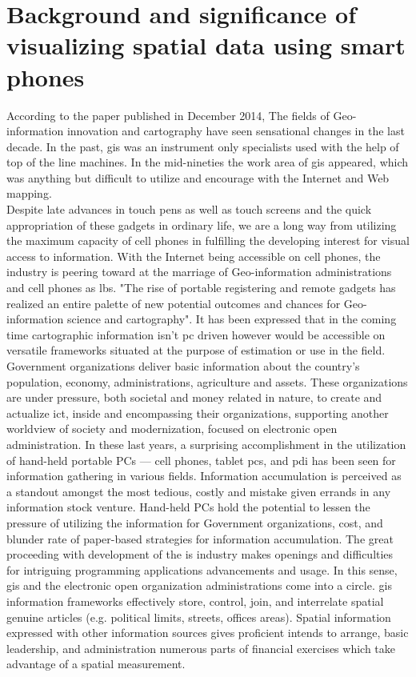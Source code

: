\section{Background and significance of visualizing spatial data using smart phones}

According to the paper published in December 2014\cite{GSR_3}, The fields of Geo-information innovation and cartography have seen sensational changes in the last decade. In the past, \gls{gis} was an instrument only specialists used with the help of top of the line machines. In the mid-nineties the work area of \gls{gis} appeared, which was anything but difficult to utilize and encourage with the Internet and Web mapping. \\
Despite late advances in touch pens as well as touch screens and the quick appropriation of these gadgets in ordinary life, we are a long way from utilizing the maximum capacity of cell phones in fulfilling the developing interest for visual access to information. With the Internet being accessible on cell phones, the industry is peering toward at the marriage of Geo-information administrations and cell phones as \gls{lbs}. "The rise of portable registering and remote gadgets has realized an entire palette of new potential outcomes and chances for Geo-information science and cartography". It has been expressed that in the coming time cartographic information isn't \gls{pc} driven however would be accessible on versatile frameworks situated at the purpose of estimation or use in the field. \\
Government organizations deliver basic information about the country's population, economy, administrations, agriculture and assets. These organizations are under pressure, both societal and money related in nature, to create and actualize \gls{ict}, inside and encompassing their organizations, supporting another worldview of society and modernization, focused on electronic open administration. In these last years, a surprising accomplishment in the utilization of hand-held portable PCs — cell phones, tablet \gls{pc}s, and \gls{pdi} has been seen for information gathering in various fields.
Information accumulation is perceived as a standout amongst the most tedious, costly and mistake given errands in any information stock venture. Hand-held PCs hold the potential to lessen the pressure of utilizing the information for Government organizations, cost, and blunder rate of paper-based strategies for information accumulation. The great proceeding with development of the \gls{is} industry makes openings and difficulties for intriguing programming applications advancements and usage. In this sense, \gls{gis} and the electronic open organization administrations come into a circle. \gls{gis} information frameworks effectively store, control, join, and interrelate spatial genuine articles (e.g. political limits, streets, offices areas). Spatial information expressed with other information sources gives proficient intends to arrange, basic leadership, and administration numerous parts of financial exercises which take advantage of a spatial measurement.

